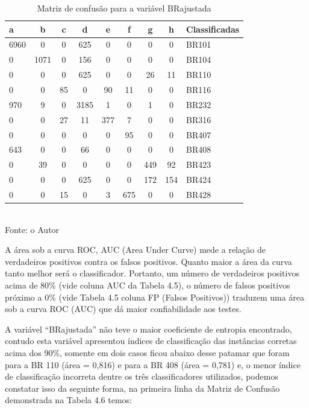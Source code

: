 \begin{enumerate}
	\begin{table}[!ht]
		\centering
		\caption{Matriz de confusão para a variável BRajustada}
		\vspace{1mm}
		\begin{tabular}{l|c|c|c|c|c|c|c|l}
			\hline
			\textbf{a} & \textbf{b} & \textbf{c} & \textbf{d} & \textbf{e} & \textbf{f} & \textbf{g} & \textbf{h} & \textbf{Classificadas}\\
			\hline
			6960 & 0 & 0 & 625 & 0 & 0 & 0 & 0 & BR101 \\
			0 & 1071 & 0 & 156 & 0 & 0 & 0 & 0  & BR104 \\
			0 & 0 & 0 & 625 & 0 & 0 & 26 & 11  & BR110 \\
			0 & 0 & 85 & 0 & 90 & 11 & 0 & 0  & BR116 \\
			970 & 9 & 0 & 3185 & 1 & 0 & 1 & 0  & BR232 \\
			0 & 0 & 27 & 11 & 377 & 7 & 0 & 0  & BR316 \\
			0 & 0 & 0 & 0 & 0 & 95 & 0 & 0  & BR407 \\
			643 & 0 & 0 & 66 & 0 & 0 & 0 & 0  & BR408 \\
			0 & 39 & 0 & 0 & 0 & 0 & 449 & 92  & BR423 \\
			0 & 0 & 0 & 625 & 0 & 0 & 172 & 154  & BR424 \\
			0 & 0 & 15 & 0 & 3 & 675 & 0 & 0  & BR428 \\			
		\end{tabular}
		\\
		\tiny Fonte: o Autor
	\end{table}	

\end{enumerate}


A área sob a curva ROC, AUC (Area Under Curve) mede a
relação de verdadeiros positivos contra os falsos positivos.
Quanto maior a área da curva tanto melhor será o
classificador. Portanto, um número de verdadeiros positivos
acima de 80\% (vide coluna AUC da Tabela 4.5), o número de falsos positivos próximo a 0\% (vide Tabela 4.5 coluna FP (Falsos Positivos))
traduzem uma área sob a curva ROC (AUC) que dá maior confiabilidade
aos testes.

\pagebreak

A variável “BRajustada” não teve o maior coeficiente de
entropia encontrado, contudo esta variável apresentou
índices de classificação das instâncias corretas acima dos 90\%, somente em dois casos ficou abaixo desse patamar que foram para a BR 110 (área = 0,816) e para a BR 408 (área = 0,781) e,
o menor índice de classificação incorreta dentre os três
classificadores utilizados, podemos constatar isso da seguinte forma, na primeira linha da Matriz de Confusão demonstrada na Tabela 4.6 temos:


